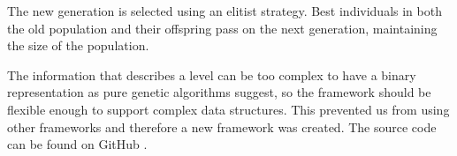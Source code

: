 \documentclass[sigconf]{acmart}
\begin{document}
The new generation is selected using an elitist strategy. Best individuals in 
both the old population and their offspring pass on the next generation, 
maintaining the size of the population.








The information that describes a level can be too complex to have a binary 
representation as pure genetic algorithms suggest, so the framework should be 
flexible enough to support complex data structures. This prevented us from using other 
frameworks
and therefore a new framework was created. The source  code can be found on GitHub \cite{ab-level}.

\end{document}
